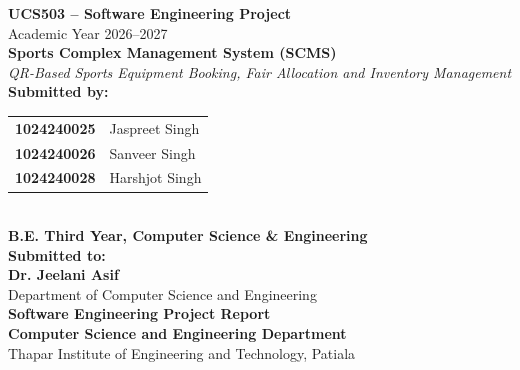 \documentclass[12pt,a4paper,oneside]{report}
\begin{document}
\begin{titlepage}
    \centering
    \vspace*{0.5cm}

    {\Large\bfseries UCS503 -- Software Engineering Project}\\[0.3cm]
    {\large Academic Year 2026--2027}\\[1.4cm]

    {\Huge\bfseries Sports Complex Management System (SCMS)}\\[0.5cm]
    {\large\textit{QR-Based Sports Equipment Booking, Fair Allocation and Inventory Management}}\\[1.8cm]

    {\large\textbf{Submitted by:}}\\[0.3cm]
    \begin{tabular}{ll}
        \textbf{1024240025} & Jaspreet Singh \\
        \textbf{1024240026} & Sanveer Singh \\
        \textbf{1024240028} & Harshjot Singh \\
    \end{tabular}\\[0.5cm]

    {\normalsize\textbf{B.E. Third Year, Computer Science \& Engineering}}\\[1.5cm]

    {\large\textbf{Submitted to:}}\\[0.2cm]
    {\large\textbf{Dr. Jeelani Asif}}\\[0.1cm]
    {\normalsize Department of Computer Science and Engineering}\\[1.2cm]

    \vfill
    {\normalsize\textbf{Software Engineering Project Report}}\\[0.15cm]
    {\normalsize\textbf{Computer Science and Engineering Department}}\\[0.1cm]
    {\normalsize Thapar Institute of Engineering and Technology, Patiala}\\[0.4cm]
\end{titlepage}

\tableofcontents
\newpage
{}
\end{document}
